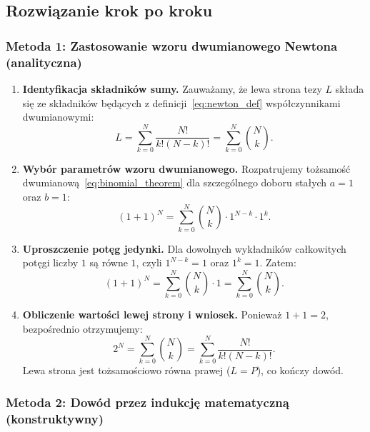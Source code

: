 \subsection*{Rozwiązanie krok po kroku}

\subsubsection*{Metoda 1: Zastosowanie wzoru dwumianowego Newtona (analityczna)}

\begin{enumerate}[label=\textbf{Krok \arabic*.},leftmargin=*]
    \item \textbf{Identyfikacja składników sumy.}
    Zauważamy, że lewa strona tezy $L$ składa się ze składników będących z definicji~\eqref{eq:newton_def} współczynnikami dwumianowymi:
    \begin{equation*}
        L = \sum_{k=0}^{N} \frac{N!}{k!(N-k)!} = \sum_{k=0}^{N} \binom{N}{k}.
    \end{equation*}

    \item \textbf{Wybór parametrów wzoru dwumianowego.}
    Rozpatrujemy tożsamość dwumianową~\eqref{eq:binomial_theorem} dla szczególnego doboru stałych $a = 1$ oraz $b = 1$:
    \begin{equation*}
        (1 + 1)^N = \sum_{k=0}^{N} \binom{N}{k} \cdot 1^{N-k} \cdot 1^k.
    \end{equation*}

    \item \textbf{Uproszczenie potęg jedynki.}
    Dla dowolnych wykładników całkowitych potęgi liczby $1$ są równe $1$, czyli $1^{N-k} = 1$ oraz $1^k = 1$. Zatem:
    \begin{equation*}
        (1 + 1)^N = \sum_{k=0}^{N} \binom{N}{k} \cdot 1 = \sum_{k=0}^{N} \binom{N}{k}.
    \end{equation*}

    \item \textbf{Obliczenie wartości lewej strony i wniosek.}
    Ponieważ $1 + 1 = 2$, bezpośrednio otrzymujemy:
    \begin{equation*}
        2^N = \sum_{k=0}^{N} \binom{N}{k} = \sum_{k=0}^{N} \frac{N!}{k!(N-k)!}.
    \end{equation*}
    Lewa strona jest tożsamościowo równa prawej ($L = P$), co kończy dowód.
\end{enumerate}

\subsubsection*{Metoda 2: Dowód przez indukcję matematyczną (konstruktywny)}

